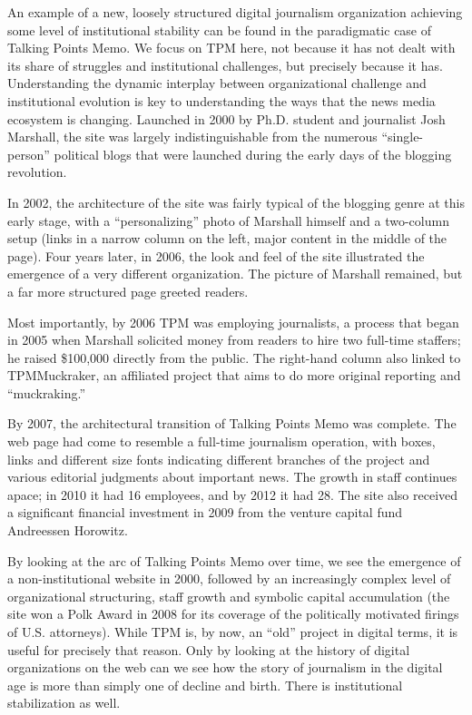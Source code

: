 An example of a new, loosely structured digital journalism organization achieving
some level of institutional stability can be found in the paradigmatic case
of Talking Points Memo. We focus on TPM here, not because it has not dealt
with its share of struggles and institutional challenges, but precisely because it
has. Understanding the dynamic interplay between organizational challenge
and institutional evolution is key to understanding the ways that the news
media ecosystem is changing. Launched in 2000 by Ph.D. student and journalist
Josh Marshall, the site was largely indistinguishable from the numerous
``single-person'' political blogs that were launched during the early days of the
blogging revolution.

In 2002, the architecture of the site was fairly typical of the blogging genre at this
early stage, with a ``personalizing'' photo of Marshall himself and a two-column
setup (links in a narrow column on the left, major content in the middle of the
page). Four years later, in 2006, the look and feel of the site illustrated the emergence
of a very different organization. The picture of Marshall remained, but a
far more structured page greeted readers.

Most importantly, by 2006 TPM was employing journalists, a process that began
in 2005 when Marshall solicited money from readers to hire two full-time staffers;
he raised \$100,000 directly from the public. The right-hand column also
linked to TPMMuckraker, an affiliated project that aims to do more original
reporting and ``muckraking.''

By 2007, the architectural transition of Talking Points Memo was complete. The
web page had come to resemble a full-time journalism operation, with boxes,
links and different size fonts indicating different branches of the project and
various editorial judgments about important news. The growth in staff continues
apace; in 2010 it had 16 employees, and by 2012 it had 28. The site also received
a significant financial investment in 2009 from the venture capital fund Andreessen
Horowitz.

By looking at the arc of Talking Points Memo over time, we see the emergence
of a non-institutional website in 2000, followed by an increasingly complex level
of organizational structuring, staff growth and symbolic capital accumulation (the
site won a Polk Award in 2008 for its coverage of the politically motivated firings
of U.S. attorneys). While TPM is, by now, an ``old'' project in digital terms, it is useful
for precisely that reason. Only by looking at the history of digital organizations
on the web can we see how the story of journalism in the digital age is more than
simply one of decline and birth. There is institutional stabilization as well.

